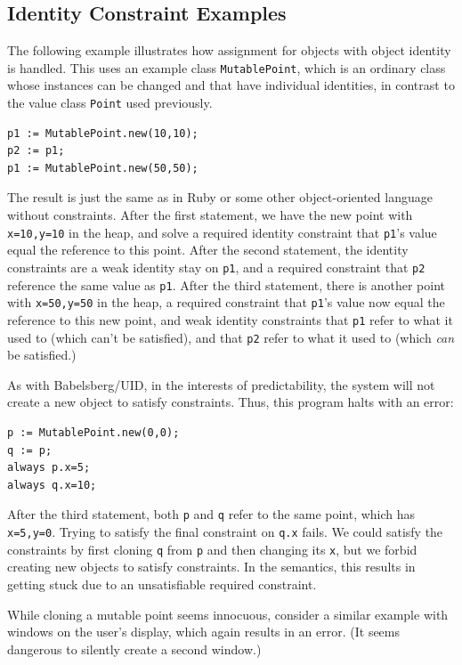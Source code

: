\documentclass{article}
\begin{document}
\subsection{Identity Constraint Examples}

The following example illustrates how assignment for objects with
object identity is handled.  This uses an example class
\verb|MutablePoint|, which is an ordinary class whose instances can be
changed and that have individual identities, in contrast to the value
class \verb|Point| used previously.

\begin{verbatim}
p1 := MutablePoint.new(10,10);
p2 := p1;
p1 := MutablePoint.new(50,50);
\end{verbatim}

The result is just the same as in Ruby or some other object-oriented
language without constraints.  After the first statement, we have the
new point with \verb|x=10,y=10| in the heap, and solve a required identity
constraint that \verb|p1|'s value equal the reference to this point.
After the second statement, the identity constraints are a weak
identity stay on \verb|p1|, and a required constraint that \verb|p2|
reference the same value as \verb|p1|.  After the third statement,
there is another point with \verb|x=50,y=50| in the heap, a required
constraint that \verb|p1|'s value now equal the reference to this new
point, and weak identity constraints that \verb|p1| refer to what it
used to (which can't be satisfied), and that \verb|p2| refer to what
it used to (which \emph{can} be satisfied.)

As with Babelsberg/UID, in the interests of predictability, the system
will not create a new object to satisfy constraints.  Thus, this
program halts with an error:
\begin{verbatim}
p := MutablePoint.new(0,0);
q := p;
always p.x=5;
always q.x=10;
\end{verbatim}

After the third statement, both \verb|p| and \verb|q| refer to the
same point, which has \verb|x=5,y=0|.  Trying to satisfy the final
constraint on \verb|q.x| fails.  We could satisfy the constraints by
first cloning \verb|q| from \verb|p| and then changing its \verb|x|,
but we forbid creating new objects to satisfy constraints.  In the
semantics, this results in getting stuck due to an unsatisfiable
required constraint.

While cloning a mutable point seems innocuous, consider a similar example with
windows on the user's display, which again results in an error.  (It
seems dangerous to silently create a second window.)
\end{document}
